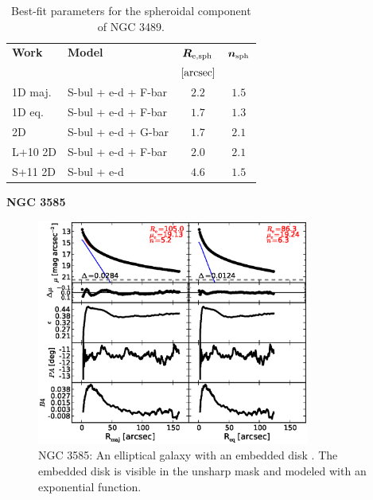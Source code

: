 \documentclass[preprint2]{emulateapj}
\newcommand{\fitfigurewidth}{0.8\textwidth}
\begin{document}
  \begin{table}[h]
  \small
  \caption{Best-fit parameters for the spheroidal component of NGC 3489.}
  \begin{center}
  \begin{tabular}{llcc}
  \hline
  {\bf Work} & {\bf Model}   & $\bm R_{\rm e,sph}$    & $\bm n_{\rm sph}$ \\
    &  &  $[\rm arcsec]$ & \\
  \hline
  1D maj. & S-bul + e-d + F-bar & $2.2$  &  $1.5$ \\
  1D eq.  & S-bul + e-d + F-bar & $1.7$  &  $1.3$ \\
  2D      & S-bul + e-d + G-bar & $1.7$  &  $2.1$ \\
  \hline
  L+10 2D         & S-bul + e-d + F-bar & $2.0$  &  $2.1$ \\
  S+11 2D         & S-bul + e-d & $4.6$  &  $1.5$ \\
  \hline
  \end{tabular}
  \end{center}
  \label{tab:n3489}
  \end{table}


  \clearpage\newpage\noindent

  {\bf NGC 3585 \\}

  \begin{figure}[h]
  \begin{center}
  \includegraphics[width=\fitfigurewidth]{n3585_1Dfit.eps}
  \caption{NGC 3585: 
  An elliptical galaxy with an embedded disk \citep{scorzabender1995}. 
  The embedded disk is visible in the unsharp mask and modeled with an exponential function. }
  \end{center}
  \end{figure}
\end{document}
